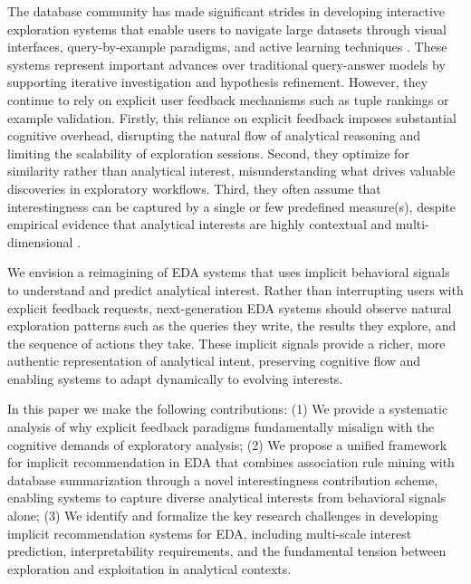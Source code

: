 \documentclass[sigconf, nonacm]{acmart}
\begin{document}
The database community has made significant strides in developing interactive exploration systems that enable users to navigate large datasets through visual interfaces, query-by-example paradigms, and active learning techniques \cite{dimitriadouAIDEActiveLearningBased2016, shen2014discovering, rezig2021dice}. These systems represent important advances over traditional query-answer models by supporting iterative investigation and hypothesis refinement. However, they continue to rely on explicit user feedback mechanisms such as tuple rankings or example validation. Firstly, this reliance on explicit feedback imposes substantial cognitive overhead, disrupting the natural flow of analytical reasoning and limiting the scalability of exploration sessions. Second, they optimize for similarity rather than analytical interest, misunderstanding what drives valuable discoveries in exploratory workflows. Third, they often assume that interestingness can be captured by a single or few predefined measure(s), despite empirical evidence that analytical interests are highly contextual and multi-dimensional \cite{somechPredictingWhatInteresting2019, chansonInterestingnessMeasuresExploratory2025a}.

We envision a reimagining of EDA systems that uses implicit behavioral signals to understand and predict analytical interest. Rather than interrupting users with explicit feedback requests, next-generation EDA systems should observe natural exploration patterns such as the queries they write, the results they explore, and the sequence of actions they take. These implicit signals provide a richer, more authentic representation of analytical intent, preserving cognitive flow and enabling systems to adapt dynamically to evolving interests.

In this paper we make the following contributions: (1) We provide a systematic analysis of why explicit feedback paradigms fundamentally misalign with the cognitive demands of exploratory analysis; (2) We propose a unified framework for implicit recommendation in EDA that combines association rule mining with database summarization through a novel interestingness contribution scheme, enabling systems to capture diverse analytical interests from behavioral signals alone; (3) We identify and formalize the key research challenges in developing implicit recommendation systems for EDA, including multi-scale interest prediction, interpretability requirements, and the fundamental tension between exploration and exploitation in analytical contexts.
\end{document}
